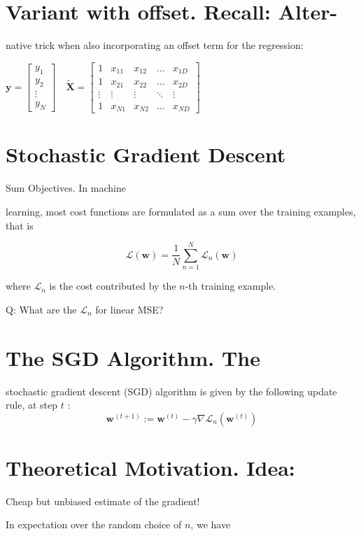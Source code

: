 \documentclass[10pt]{article}
\begin{document}
\section*{Variant with offset. Recall: Alter-}
native trick when also incorporating an offset term for the regression:

$\mathbf{y}=\left[\begin{array}{c}y_{1} \\ y_{2} \\ \vdots \\ y_{N}\end{array}\right] \quad \widetilde{\mathbf{X}}=\left[\begin{array}{ccccc}1 & x_{11} & x_{12} & \ldots & x_{1 D} \\ 1 & x_{21} & x_{22} & \ldots & x_{2 D} \\ \vdots & \vdots & \vdots & \ddots & \vdots \\ 1 & x_{N 1} & x_{N 2} & \ldots & x_{N D}\end{array}\right]$

\section*{Stochastic Gradient Descent}
Sum Objectives. In machine

learning, most cost functions are formulated as a sum over the training examples, that is

$$
\mathcal{L}(\mathbf{w})=\frac{1}{N} \sum_{n=1}^{N} \mathcal{L}_{n}(\mathbf{w})
$$

where $\mathcal{L}_{n}$ is the cost contributed by the $n$-th training example.

Q: What are the $\mathcal{L}_{n}$ for linear MSE?

\section*{The SGD Algorithm. The}
 stochastic gradient descent (SGD) algorithm is given by the following update rule, at step $t$ :$$
\mathbf{w}^{(t+1)}:=\mathbf{w}^{(t)}-\gamma \nabla \mathcal{L}_{n}\left(\mathbf{w}^{(t)}\right)
$$

\section*{Theoretical Motivation. Idea:}
Cheap but unbiased estimate of the gradient!

In expectation over the random choice of $n$, we have
\end{document}
